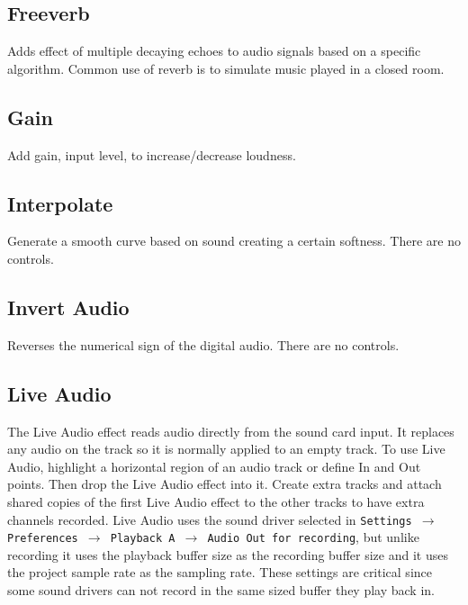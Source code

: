 \subsection{Freeverb}%
\label{sub:freeverb}

Adds effect of multiple decaying echoes to audio signals based on a specific algorithm. Common use of reverb is to simulate music played in a closed room.

\subsection{Gain}%
\label{sub:gain}

Add gain, input level, to increase/decrease loudness.

\subsection{Interpolate}%
\label{sub:interpolate}

Generate a smooth curve based on sound creating a certain softness. There are no controls.

\subsection{Invert Audio}%
\label{sub:invert_audio}

Reverses the numerical sign of the digital audio. There are no controls.

\subsection{Live Audio}%
\label{sub:live_audio}

The Live Audio effect reads audio directly from the sound card input. It replaces any audio on the track so it is normally applied to an empty track. To use Live Audio, highlight a horizontal region of an audio track or define In and Out points. Then drop the Live Audio effect into it. Create extra tracks and attach shared copies of the first Live Audio effect to the other tracks to have extra channels recorded. Live Audio uses the sound driver selected in \texttt{Settings $\rightarrow$ Preferences $\rightarrow$ Playback A $\rightarrow$ Audio Out for recording}, but unlike recording it uses the playback buffer size as the recording buffer size and it uses the project sample rate as the sampling rate. These settings are critical since some sound drivers can not record in the same sized buffer they play back in. 

